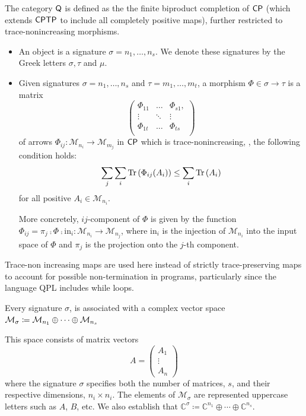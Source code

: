 \begin{definition} \label{def:catQ}
  The category $\mathsf{Q}$ is defined as the the finite biproduct completion of $\mathsf{CP}$ (which extends $\mathsf{CPTP}$ to include all completely positive maps),  further restricted to trace-nonincreasing morphisms. 
  \begin{itemize}
    \item An object is a signature $\sigma= n_1, \ldots, n_s$. We denote these signatures by the Greek letters $\sigma, \tau$ and $\mu$.
    \item  Given signatures  $\sigma = n_1, \ldots, n_s $ and $\tau= m_1, \ldots, m_t $, a morphism $\Phi \in \sigma \to \tau $ is a matrix
    $$\begin{pmatrix}
      \Phi_{11} & \ldots & \Phi_{s1}, \\
      \vdots & \ddots  & \vdots \\
      \Phi_{1t} & \ldots & \Phi_{ts} \\
    \end{pmatrix}$$
    of arrows $\Phi_{ij}: \mathcal{M}_{n_i} \rightarrow \mathcal{M}_{m_j}$ in $\mathsf{CP}$ which is trace-nonincreasing, \ie, the following condition holds:
    $$ \sum_j \sum_i \text{Tr} \left(\Phi_{ij} (A_i)\right)   \leq  \sum_i \text{Tr} \left(A_i\right) $$
   for all positive $A_i \in \mathcal{M}_{n_i}$.

    More concretely, $ij$-component of $\Phi$ is given by the function $\Phi_{ij} = \pi_{j} \comp \Phi \comp \mathrm{in}_{i} : \mathcal{M}_{n_i} \rightarrow \mathcal{M}_{n_j} $, where $\mathrm{in}_{i}$ is the injection of  $\mathcal{M}_{n_i}$ into the input space of $\Phi$ and  $\pi_{j}$ is the projection onto the $j$-th component.
  \end{itemize}
\end{definition}

Trace-non increasing  maps are used here instead of strictly trace-preserving maps to account for possible non-termination in programs, particularly since the language  QPL includes while loops.

Every signature $\sigma$, is associated with a complex vector space   
$\mathcal{M}_\sigma \coloneqq \mathcal{M}_{n_1} \oplus \cdots \oplus \mathcal{M}_{n_s}$

This space consists of matrix vectors 
$$A = \begin{pmatrix} A_1 \\ \vdots \\ A_n \end{pmatrix}$$
where the signature $\sigma$ specifies both the number of matrices, $s$,  and their respective dimensions, $n_i \times n_i$. The elements of $\mathcal{M}_\sigma$ are represented uppercase letters such as $A$, $B$, etc.
We also establish that $\mathbb{C}^\sigma \coloneqq \mathbb{C}^{n_1} \oplus \cdots \oplus \mathbb{C}^{n_s}$.

